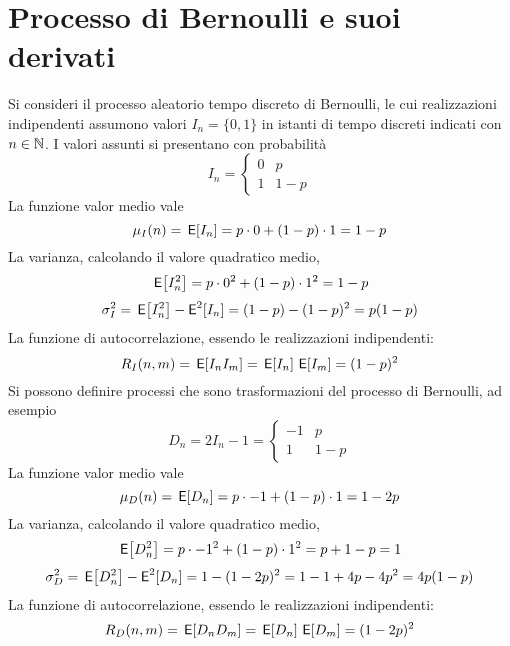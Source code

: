 \section{Processo di Bernoulli e suoi derivati}
Si consideri il processo aleatorio tempo discreto di Bernoulli, le cui realizzazioni indipendenti assumono valori $I_n=\{0,1\}$ in istanti di tempo discreti indicati con $n\in\mathbb{N}$. I valori assunti si presentano con probabilità
\begin{equation}
	I_n=\begin{cases}
		0&p\\
		1&1-p
	\end{cases}
\end{equation}
La funzione valor medio vale
\begin{equation}
	\mu_I(n)=\,{\operatorname{\mathsf{E}}}\!\left[{I_n}\right]=p\cdot 0+(1-p)\cdot 1=1-p
\end{equation}
La varianza, calcolando il valore quadratico medio,
\[
	\,{\operatorname{\mathsf{E}}}\!\left[{I^2_n}\right]=p\cdot 0^2+(1-p)\cdot 1^2=1-p
\]
\begin{equation}
	\sigma^2_I=\,{\operatorname{\mathsf{E}}}\!\left[{I^2_n}\right]-\operatorname{\mathsf{E}}^2[I_n]=(1-p)-(1-p)^2=p(1-p)
\end{equation}
La funzione di autocorrelazione, essendo le realizzazioni indipendenti:
\begin{equation}
	R_I(n,m)=\,{\operatorname{\mathsf{E}}}\!\left[{I_n I_m}\right]=\,{\operatorname{\mathsf{E}}}\!\left[{I_n}\right]\,{\operatorname{\mathsf{E}}}\!\left[{I_m}\right]=(1-p)^2
\end{equation}
Si possono definire processi che sono trasformazioni del processo di Bernoulli, ad esempio
\begin{equation}
	D_n=2I_n-1=\begin{cases}
		-1&p\\
		1&1-p
	\end{cases}
\end{equation}
La funzione valor medio vale
\begin{equation}
	\mu_D(n)=\,{\operatorname{\mathsf{E}}}\!\left[{D_n}\right]=p\cdot -1+(1-p)\cdot 1=1-2p
\end{equation}
La varianza, calcolando il valore quadratico medio,
\[
	\,{\operatorname{\mathsf{E}}}\!\left[{D^2_n}\right]=p\cdot -1^2+(1-p)\cdot 1^2=p+1-p=1
\]
\begin{equation}
	\sigma^2_D=\,{\operatorname{\mathsf{E}}}\!\left[{D^2_n}\right]-\operatorname{\mathsf{E}}^2[D_n]=1-(1-2p)^2=1-1+4p-4p^2=4p(1-p)
\end{equation}
La funzione di autocorrelazione, essendo le realizzazioni indipendenti:
\begin{equation}
	R_D(n,m)=\,{\operatorname{\mathsf{E}}}\!\left[{D_n D_m}\right]=\,{\operatorname{\mathsf{E}}}\!\left[{D_n}\right]\,{\operatorname{\mathsf{E}}}\!\left[{D_m}\right]=(1-2p)^2
\end{equation}

